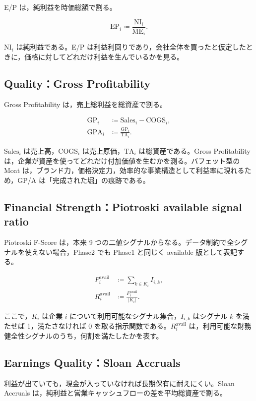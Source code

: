 \documentclass[a4paper,10pt]{article}
\newcommand{\ME}{\mathrm{ME}}
\newcommand{\NI}{\mathrm{NI}}
\newcommand{\GP}{\mathrm{GP}}
\newcommand{\TA}{\mathrm{TA}}
\newcommand{\EP}{\mathrm{EP}}
\newcommand{\GPA}{\mathrm{GPA}}
\newcommand{\1}{\mathbf{1}}
\begin{document}
E/P は，純利益を時価総額で割る。

\begin{equation}
\EP_i \coloneqq \frac{\NI_i}{\ME_i} .
\label{eq:ep}
\end{equation}

$\NI_i$ は純利益である。E/P は利益利回りであり，会社全体を買ったと仮定したときに，価格に対してどれだけ利益を生んでいるかを見る。

\subsection{Quality：Gross Profitability}
Gross Profitability は，売上総利益を総資産で割る。

\begin{align}
\GP_i &\coloneqq \mathrm{Sales}_i - \mathrm{COGS}_i, \label{eq:gp}\\
\GPA_i &\coloneqq \frac{\GP_i}{\TA_i}. \label{eq:gpa}
\end{align}

$\mathrm{Sales}_i$ は売上高，$\mathrm{COGS}_i$ は売上原価，$\TA_i$ は総資産である。Gross Profitability は，企業が資産を使ってどれだけ付加価値を生むかを測る。バフェット型の Moat は，ブランド力，価格決定力，効率的な事業構造として利益率に現れるため，GP/A は「完成された堀」の痕跡である。

\subsection{Financial Strength：Piotroski available signal ratio}
Piotroski F-Score は，本来 9 つの二値シグナルからなる。データ制約で全シグナルを使えない場合，Phase2 でも Phase1 と同じく available 版として表記する。

\begin{align}
F_i^{\mathrm{avail}} &\coloneqq \sum_{k\in K_i} I_{i,k}, \label{eq:favail}\\
R_i^{\mathrm{avail}} &\coloneqq \frac{F_i^{\mathrm{avail}}}{|K_i|}. \label{eq:ravail}
\end{align}

ここで，$K_i$ は企業 $i$ について利用可能なシグナル集合，$I_{i,k}$ はシグナル $k$ を満たせば 1，満たさなければ 0 を取る指示関数である。$R_i^{\mathrm{avail}}$ は，利用可能な財務健全性シグナルのうち，何割を満たしたかを表す。

\subsection{Earnings Quality：Sloan Accruals}
利益が出ていても，現金が入っていなければ長期保有に耐えにくい。Sloan Accruals は，純利益と営業キャッシュフローの差を平均総資産で割る。
\end{document}
